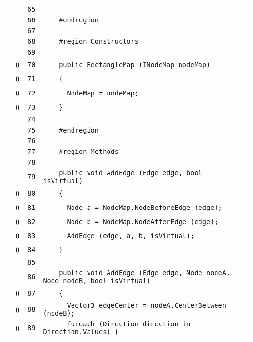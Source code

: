 \documentclass[a4paper,10pt]{article}
\begin{document}
\begin{longtable}[l]{lrrl}
\cellcolor{gray} &  & \verb~65~ & \verb~~\\
\cellcolor{gray} &  & \verb~66~ & \verb~    #endregion~\\
\cellcolor{gray} &  & \verb~67~ & \verb~~\\
\cellcolor{gray} &  & \verb~68~ & \verb~    #region Constructors~\\
\cellcolor{gray} &  & \verb~69~ & \verb~~\\
\cellcolor{red} & 0 & \verb~70~ & \verb~    public RectangleMap (INodeMap nodeMap)~\\
\cellcolor{red} & 0 & \verb~71~ & \verb~    {~\\
\cellcolor{red} & 0 & \verb~72~ & \verb~      NodeMap = nodeMap;~\\
\cellcolor{red} & 0 & \verb~73~ & \verb~    }~\\
\cellcolor{gray} &  & \verb~74~ & \verb~~\\
\cellcolor{gray} &  & \verb~75~ & \verb~    #endregion~\\
\cellcolor{gray} &  & \verb~76~ & \verb~~\\
\cellcolor{gray} &  & \verb~77~ & \verb~    #region Methods~\\
\cellcolor{gray} &  & \verb~78~ & \verb~~\\
\cellcolor{gray} &  & \verb~79~ & \verb~    public void AddEdge (Edge edge, bool isVirtual)~\\
\cellcolor{red} & 0 & \verb~80~ & \verb~    {~\\
\cellcolor{red} & 0 & \verb~81~ & \verb~      Node a = NodeMap.NodeBeforeEdge (edge);~\\
\cellcolor{red} & 0 & \verb~82~ & \verb~      Node b = NodeMap.NodeAfterEdge (edge);~\\
\cellcolor{red} & 0 & \verb~83~ & \verb~      AddEdge (edge, a, b, isVirtual);~\\
\cellcolor{red} & 0 & \verb~84~ & \verb~    }~\\
\cellcolor{gray} &  & \verb~85~ & \verb~~\\
\cellcolor{gray} &  & \verb~86~ & \verb~    public void AddEdge (Edge edge, Node nodeA, Node nodeB, bool isVirtual)~\\
\cellcolor{red} & 0 & \verb~87~ & \verb~    {~\\
\cellcolor{red} & 0 & \verb~88~ & \verb~      Vector3 edgeCenter = nodeA.CenterBetween (nodeB);~\\
\cellcolor{red} & 0 & \verb~89~ & \verb~      foreach (Direction direction in Direction.Values) {~\\

\end{longtable}
\end{document}
